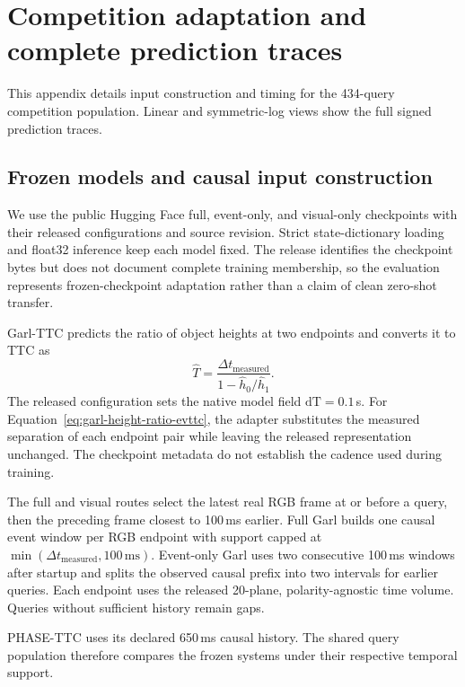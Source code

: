 \section{Competition adaptation and complete prediction traces}
\label{app:competition-details}
This appendix details input construction and timing for the 434-query competition population. Linear and symmetric-log views show the full signed prediction traces.

\subsection{Frozen models and causal input construction}

We use the public Hugging Face full, event-only, and visual-only checkpoints with their released configurations and source revision. Strict state-dictionary loading and float32 inference keep each model fixed. The release identifies the checkpoint bytes but does not document complete training membership, so the evaluation represents frozen-checkpoint adaptation rather than a claim of clean zero-shot transfer.

Garl-TTC predicts the ratio of object heights at two endpoints and converts it to TTC as
\begin{equation}
 \widehat T
 =\frac{\Delta t_{\mathrm{measured}}}
 {1-\widehat h_0/\widehat h_1}.
 \label{eq:garl-height-ratio-evttc}
\end{equation}
The released configuration sets the native model field $\mathrm{dT}=0.1$\,s. For Equation~\ref{eq:garl-height-ratio-evttc}, the adapter substitutes the measured separation of each endpoint pair while leaving the released representation unchanged. The checkpoint metadata do not establish the cadence used during training.

The full and visual routes select the latest real RGB frame at or before a query, then the preceding frame closest to 100\,ms earlier. Full Garl builds one causal event window per RGB endpoint with support capped at $\min(\Delta t_{\mathrm{measured}},100\,\mathrm{ms})$. Event-only Garl uses two consecutive 100\,ms windows after startup and splits the observed causal prefix into two intervals for earlier queries. Each endpoint uses the released 20-plane, polarity-agnostic time volume. Queries without sufficient history remain gaps.

PHASE-TTC uses its declared 650\,ms causal history. The shared query population therefore compares the frozen systems under their respective temporal support.

